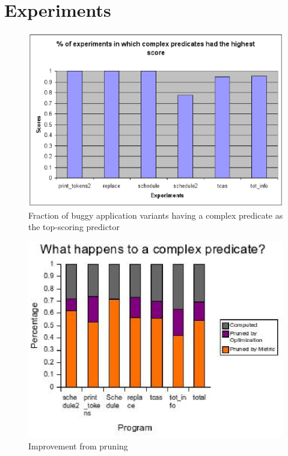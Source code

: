 
\section{Experiments}
\label{sec-quant}
\begin{figure}
  \centering
  \includegraphics{charts/top-pred}
  \caption{Fraction of buggy application variants having a complex predicate as the top-scoring predictor}
  \label{fig-top-pred}
\end{figure}

\begin{figure}
  \centering
  \includegraphics[width=\columnwidth]{charts/pruning}
  \caption{Improvement from pruning}
  \label{fig-pruning}
\end{figure}


